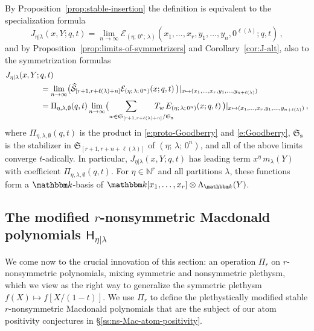\documentclass[12pt]{amsart}
\theoremstyle{definition}
\theoremstyle{remark}
\newcommand{\NN}{{\mathbb N}}
\newcommand{\kk}{{\mathbbm k}}
\newcommand{\sS}{{\mathbf s}}
\newcommand{\Sfrak}{{\mathfrak S}}
\newcommand{\Ecal}{{\mathcal E}}
\newcommand{\Scal}{{\mathcal S}}
\newcommand{\Pisf}{{\mathsf \Pi }}
\newcommand{\hsym}{\widehat{\Scal}}    %
\newcommand{\mE}{\mathsf H}   %
\newcommand{\Jns}{J}           %
\begin{document}
By Proposition~\ref{prop:stable-insertion} the definition is
equivalent to the specialization formula
\begin{equation}\label{e:right-stable-spec}
\Jns _{\eta |\lambda }(x,Y;q,t)  =
\lim_{n\rightarrow \infty } \Ecal _{(\eta ;\, 0^{n};\, \lambda
)}(x_{1},\ldots,x_{r}, y_{1},\ldots,y_{n},0^{\ell (\lambda )}; q,t)\, ,
\end{equation}
and by Proposition~\ref{prop:limits-of-symmetrizers} and
Corollary~\ref{cor:J-alt}, also to the symmetrization formulas
\begin{equation}\label{e:right-stable-symm}
\begin{aligned}
\Jns _{\eta |\lambda }(x,Y;\, & q,t) \\
& = \lim_{n\rightarrow \infty } \bigl(\hsym_{[r+1,r+\ell (\lambda
)+n]} \Ecal _{(\eta ;\, \lambda ;\, 0^{n})}(x;q,t)\, \bigr)
|_{x\mapsto
(x_{1},\ldots,x_{r}, y_{1},\ldots,y_{n+\ell (\lambda )})}\\
& = \Pi _{\eta ,\lambda ,\emptyset }(q,t) \lim_{n\rightarrow \infty }
\bigl( \sum _{w \in \Sfrak _{[r+1, r+\ell(\lambda )+n ]}/ \Sfrak _{\sS
} \hspace{-6ex}} T_{w}\, E _{(\eta ;\, \lambda ;\, 0^{n})}(x;q,t)\,
\bigr) |_{x\mapsto (x_{1},\ldots,x_{r}, y_{1},\ldots,y_{n+\ell
(\lambda )})}\, ,
\end{aligned}
\end{equation}
where $\Pi _{\eta ,\lambda ,\emptyset }(q,t)$ is the product in
\eqref{e:proto-Goodberry} and \eqref{e:Goodberry}, $\Sfrak _{\sS }$ is
the stabilizer in $\Sfrak _{[r+1, r+n+\ell (\lambda ) ]}$ of $(\eta
;\, \lambda ;\, 0^{n})$, and all of the above limits converge
$t$-adically.  In particular, $\Jns _{\eta |\lambda }(x,Y;q,t)$ has
leading term $x^{\eta } \, m_{\lambda }(Y)$ with coefficient $\Pi
_{\eta ,\lambda ,\emptyset }(q,t)$.  For $\eta \in \NN ^{r}$ and all
partitions $\lambda $, these functions form a $\kk $-basis of $\kk
[x_{1},\ldots,x_{r}]\otimes \Lambda _{\kk }(Y)$.


\subsection{The modified \texorpdfstring{$r$}{r}-nonsymmetric
Macdonald polynomials \texorpdfstring{$\mE_{\eta|\lambda}$}{}}
\label{ss:r mod nsmac}

We come now to the crucial innovation of this section: an operation
$\Pisf _{r}$ on $r$-nonsymmetric polynomials, mixing symmetric and
nonsymmetric plethysm, which we view as the right way to generalize
the symmetric plethysm $f(X)\mapsto f[X/(1 - t)]$.  We use $\Pisf
_{r}$ to define the plethystically modified stable $r$-nonsymmetric
Macdonald polynomials that are the subject of our atom positivity
conjectures in \S \ref{ss:ns-Mac-atom-positivity}.
\end{document}

